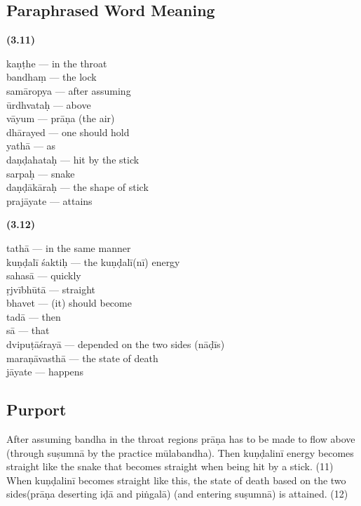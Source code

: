 \subsection*{Paraphrased Word Meaning}

\noindent \textbf{(3.11)}

\begin{multicols}{2}
kaṇṭhe --- in the throat \\
bandhaṃ --- the lock \\
samāropya --- after assuming \\
ūrdhvataḥ --- above \\
vāyum --- prāṇa (the air)\\
dhārayed --- one should hold \\
yathā --- as \\
daṇḍahataḥ --- hit by the stick \\
sarpaḥ --- snake \\
daṇḍākāraḥ --- the shape of stick \\
prajāyate --- attains 
\end{multicols}

\noindent \textbf{(3.12)}

\begin{multicols}{2}
tathā --- in the same manner \\
kuṇḍalī  śaktiḥ --- the kuṇḍalī(nī)  energy \\
sahasā --- quickly \\
ṛjvībhūtā --- straight \\
bhavet ---  (it) should become \\
tadā --- then \\
sā --- that \\
dvipuṭāśrayā --- depended on the two sides (nāḍīs)\\
maraṇāvasthā --- the state of death \\
jāyate --- happens
\end{multicols}

\subsection*{Purport}

After assuming bandha in the throat regions prāṇa has to be made to flow above (through suṣumnā by the practice  mūlabandha). Then kuṇḍalinī energy becomes straight like the snake that becomes straight when being hit by a stick. (11) When kuṇḍalinī becomes straight like this, the state of death based on the two sides(prāṇa deserting iḍā and piṅgalā) (and entering suṣumnā) is attained. (12)

